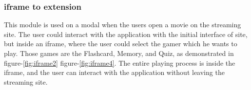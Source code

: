 \documentclass[12pt]{article}
\begin{document}



\subsubsection{iframe to extension}
      This module is used on a modal when the users open a movie on the streaming site. The user could interact with the application with the initial interface of site, but inside an iframe, where the user could select the gamer which he wants to play. 
      Those games are the Flashcard, Memory, and Quiz, as demonstrated in figure-\ref{fig:iframe2} figure-\ref{fig:iframe4}.
      The entire playing process is inside the iframe, and the user can interact with the application without leaving the streaming site.
      
      


\end{document}

